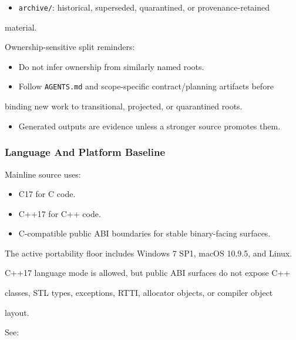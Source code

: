 \documentclass[9pt,a4paper,openany]{book}
\begin{document}
\begin{itemize}
\item \texttt{archive/\allowbreak{}}: historical, superseded, quarantined, or provenance-\allowbreak{}retained
\end{itemize}
material.\allowbreak{}


Ownership-\allowbreak{}sensitive split reminders:


\begin{itemize}
\item Do not infer ownership from similarly named roots.\allowbreak{}
\item Follow \texttt{AGENTS.\allowbreak{}md} and scope-\allowbreak{}specific contract/\allowbreak{}planning artifacts before
\end{itemize}
binding new work to transitional, projected, or quarantined roots.\allowbreak{}

\begin{itemize}
\item Generated outputs are evidence unless a stronger source promotes them.\allowbreak{}
\end{itemize}

\subsubsection{Language And Platform Baseline}

Mainline source uses:


\begin{itemize}
\item C17 for C code.\allowbreak{}
\item C++17 for C++ code.\allowbreak{}
\item C-\allowbreak{}compatible public ABI boundaries for stable binary-\allowbreak{}facing surfaces.\allowbreak{}
\end{itemize}

The active portability floor includes Windows 7 SP1, macOS 10.\allowbreak{}9.\allowbreak{}5, and Linux.\allowbreak{}

C++17 language mode is allowed, but public ABI surfaces do not expose C++

classes, STL types, exceptions, RTTI, allocator objects, or compiler object

layout.\allowbreak{}


See:
\end{document}
